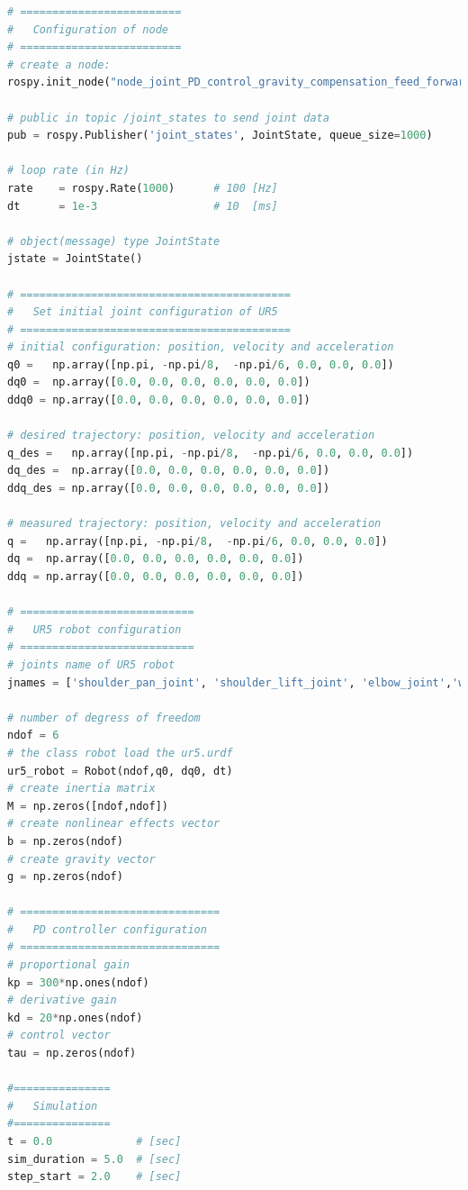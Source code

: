 \begin{lstlisting}[language=Python,caption={Move the second and fifth joint of UR5 robot with the requirement motion of activity 1.7.2}, label={lst:joint_PD_gravity_feedforward_step}]
# =========================
#   Configuration of node
# =========================
# create a node: 
rospy.init_node("node_joint_PD_control_gravity_compensation_feed_forward_term")

# public in topic /joint_states	to send joint data	
pub = rospy.Publisher('joint_states', JointState, queue_size=1000)

# loop rate (in Hz)
rate 	= rospy.Rate(1000)		# 100 [Hz]
dt 		= 1e-3					# 10  [ms]

# object(message) type JointState
jstate = JointState()

# ==========================================
#   Set initial joint configuration of UR5
# ==========================================
# initial configuration: position, velocity and acceleration 
q0 =   np.array([np.pi, -np.pi/8,  -np.pi/6, 0.0, 0.0, 0.0])
dq0 =  np.array([0.0, 0.0, 0.0, 0.0, 0.0, 0.0]) 
ddq0 = np.array([0.0, 0.0, 0.0, 0.0, 0.0, 0.0]) 

# desired trajectory: position, velocity and acceleration
q_des =   np.array([np.pi, -np.pi/8,  -np.pi/6, 0.0, 0.0, 0.0]) 
dq_des =  np.array([0.0, 0.0, 0.0, 0.0, 0.0, 0.0]) 
ddq_des = np.array([0.0, 0.0, 0.0, 0.0, 0.0, 0.0]) 

# measured trajectory: position, velocity and acceleration
q =   np.array([np.pi, -np.pi/8,  -np.pi/6, 0.0, 0.0, 0.0])
dq =  np.array([0.0, 0.0, 0.0, 0.0, 0.0, 0.0]) 
ddq = np.array([0.0, 0.0, 0.0, 0.0, 0.0, 0.0]) 

# ===========================
#   UR5 robot configuration
# ===========================
# joints name of UR5 robot
jnames = ['shoulder_pan_joint', 'shoulder_lift_joint', 'elbow_joint','wrist_1_joint', 'wrist_2_joint', 'wrist_3_joint']

# number of degress of freedom
ndof = 6
# the class robot load the ur5.urdf
ur5_robot = Robot(ndof,q0, dq0, dt)
# create inertia matrix 
M = np.zeros([ndof,ndof])
# create nonlinear effects vector
b = np.zeros(ndof)
# create gravity vector
g = np.zeros(ndof)

# ===============================
#   PD controller configuration
# ===============================
# proportional gain
kp = 300*np.ones(ndof)
# derivative gain
kd = 20*np.ones(ndof)
# control vector
tau = np.zeros(ndof)    

#===============
#   Simulation
#===============
t = 0.0             # [sec] 
sim_duration = 5.0  # [sec]
step_start = 2.0    # [sec]


\end{lstlisting}
